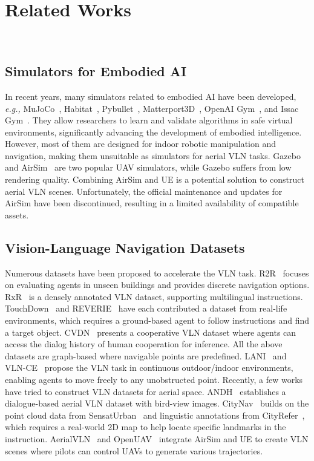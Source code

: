 \section{Related Works} ~\label{Sec:related_works}


\subsection{Simulators for Embodied AI}
In recent years, many simulators related to embodied AI have been developed, \emph{e.g.,} MuJoCo~\cite{mujoco}, Habitat~\cite{Habitat}, Pybullet~\cite{PyBullet}, Matterport3D~\cite{Matterport3D}, OpenAI Gym~\cite{OpenAI_Gym}, and Issac Gym~\cite{Isaac_Gym}. They allow researchers to learn and validate algorithms in safe virtual environments, significantly advancing the development of embodied intelligence. However, most of them are designed for indoor robotic manipulation and navigation, making them unsuitable as simulators for aerial VLN tasks. Gazebo and AirSim~\cite{airsim} are two popular UAV simulators, while Gazebo suffers from low rendering quality. Combining AirSim and UE is a potential solution to construct aerial VLN scenes. Unfortunately, the official maintenance and updates for AirSim have been discontinued, resulting in a limited availability of compatible assets.

\subsection{Vision-Language Navigation Datasets}
Numerous datasets have been proposed to accelerate the VLN task. R2R~\cite{R2R} focuses on evaluating agents in unseen buildings and provides discrete navigation options. RxR~\cite{RxR} is a densely annotated VLN dataset, supporting multilingual instructions. TouchDown~\cite{Touchdown} and REVERIE~\cite{REVERIE} have each contributed a dataset from real-life environments, which requires a ground-based agent to follow instructions and find a target object. CVDN~\cite{CVDN} presents a cooperative VLN dataset where agents can access the dialog history of human cooperation for inference. All the above datasets are graph-based where navigable points are predefined. LANI~\cite{LANI} and VLN-CE~\cite{VLN-CE} propose the VLN task in continuous outdoor/indoor environments, enabling agents to move freely to any unobstructed point. Recently, a few works have tried to construct VLN datasets for aerial space. ANDH~\cite{ANDH} establishes a dialogue-based aerial VLN dataset with bird-view images. CityNav~\cite{CityNav} builds on the point cloud data from SensatUrban~\cite{sensaturban} and linguistic annotations from CityRefer~\cite{CityRefer}, which requires a real-world 2D map to help locate specific landmarks in the instruction. AerialVLN~\cite{aerialVLN} and OpenUAV~\cite{openuav} integrate AirSim and UE to create VLN scenes where pilots can control UAVs to generate various trajectories.

